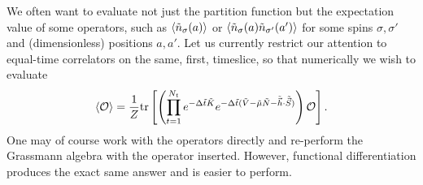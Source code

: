 We often want to evaluate not just the partition function but the expectation value of some operators, such as $\left\langle \tilde{n}_\sigma(a) \right\rangle$ or $\left\langle \tilde{n}_{\sigma}(a)\tilde{n}_{\sigma'}(a') \right\rangle$ for some spins $\sigma, \sigma'$ and (dimensionless) positions $a, a'$.
Let us currently restrict our attention to equal-time correlators on the same, first, timeslice, so that numerically we wish to evaluate
\begin{align}
	\left\langle \mathcal{O} \right\rangle
	=
	\frac{1}{Z} \text{tr}\left[ \left(\prod_{t=1}^{N_t} e^{-\Delta\tilde{t} \tilde{K}} e^{-\Delta\tilde{t}(\tilde{V} -\tilde{\mu}\tilde{N} - \tilde{\vec{h}}\cdot\tilde{\vec{S}})}\right) \mathcal{O}\right].
	\label{eq:expectation}
\end{align}
One may of course work with the operators directly and re-perform the Grassmann algebra with the operator inserted.
However, functional differentiation produces the exact same answer and is easier to perform.

